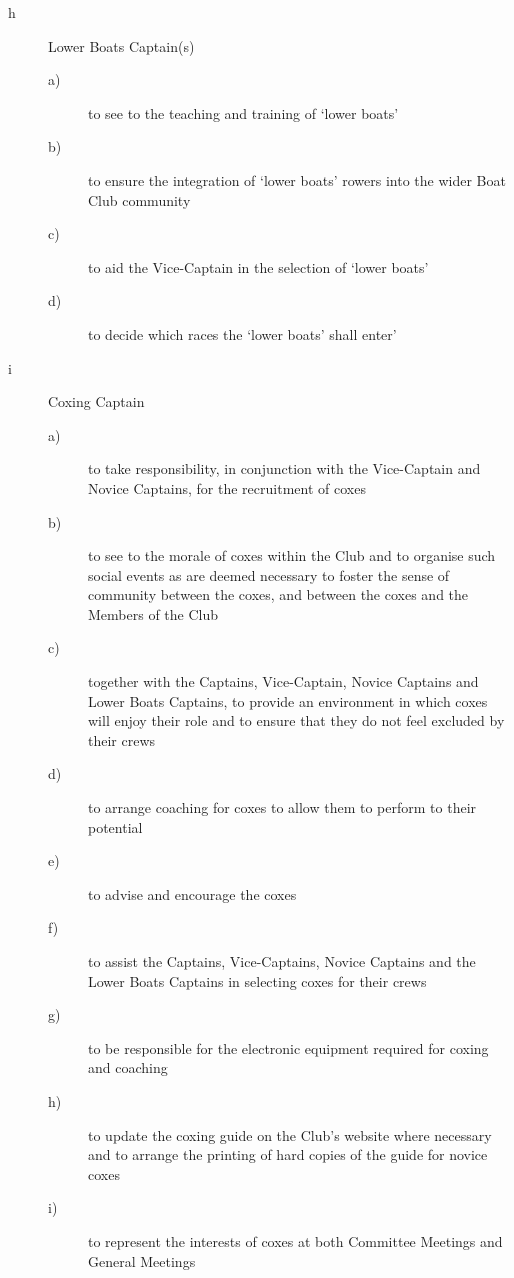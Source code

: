 \documentclass{article}
\begin{document}
\begin{description}
\begin{description}
\begin{description}
		\item[h] Lower Boats Captain(s)
		\begin{description}
			\item[a)]to see to the teaching and training of ‘lower boats’
			\item[b)] to ensure the integration of ‘lower boats’ rowers into the
			wider Boat Club community
			\item[c)] to aid the Vice-Captain in the selection of ‘lower boats’
			\item[d)] to decide which races the ‘lower boats’ shall enter’
		\end{description}
	
		\item[i] Coxing Captain
		\begin{description}
			\item[a)] to take responsibility, in conjunction with the Vice-Captain and
			Novice Captains, for the recruitment of coxes
			\item[b)] to see to the morale of coxes within the Club and to organise
			such social events as are deemed necessary to foster the sense
			of community between the coxes, and between the coxes and
			the Members of the Club
			\item[c)] together with the Captains, Vice-Captain, Novice Captains and
			Lower Boats Captains, to provide an environment in which
			coxes will enjoy their role and to ensure that they do not feel
			excluded by their crews
			\item[d)]  to arrange coaching for coxes to allow them to perform to their
			potential
			\item[e)] to advise and encourage the coxes
			\item[f)] to assist the Captains, Vice-Captains, Novice Captains and the
			Lower Boats Captains in selecting coxes for their crews
			\item[g)] to be responsible for the electronic equipment required for
			coxing and coaching
			\item[h)] to update the coxing guide on the Club's website where
			necessary and to arrange the printing of hard copies of the
			guide for novice coxes
			\item[i)] to represent the interests of coxes at both Committee Meetings
			and General Meetings
		\end{description}
		

\end{description}
\end{description}
\end{description}
\end{document}
